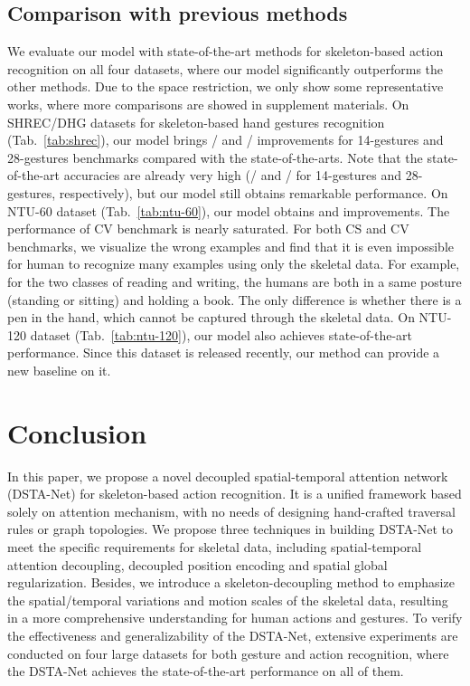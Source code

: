 \documentclass[runningheads]{llncs}
\begin{document}
\subsection{Comparison with previous methods}
We evaluate our model with state-of-the-art methods for skeleton-based action recognition on all four datasets, where our model significantly outperforms the other methods. 
Due to the space restriction, we only show some representative works, where more comparisons are showed in supplement materials. 
On SHREC/DHG datasets for skeleton-based hand gestures recognition (Tab.~\ref{tab:shrec}), our model brings / and / improvements for 14-gestures and 28-gestures benchmarks compared with the state-of-the-arts.
Note that the state-of-the-art accuracies are already very high (/ and / for 14-gestures and 28-gestures, respectively), but our model still obtains remarkable performance. 
On NTU-60 dataset (Tab.~\ref{tab:ntu-60}), our model obtains  and  improvements. 
The performance of CV benchmark is nearly saturated. For both CS and CV benchmarks, we visualize the wrong examples and find that it is even impossible for human to recognize many examples using only the skeletal data. For example, for the two classes of reading and writing, the humans are both in a same posture (standing or sitting) and holding a book. The only difference is whether there is a pen in the hand, which cannot be captured through the skeletal data. 
On NTU-120 dataset (Tab.~\ref{tab:ntu-120}), our model also achieves state-of-the-art performance. Since this dataset is released recently, our method can provide a new baseline on it. 



\section{Conclusion}
In this paper, we propose a novel decoupled spatial-temporal attention network (DSTA-Net) for skeleton-based action recognition. 
It is a unified framework based solely on attention mechanism, with no needs of designing hand-crafted traversal rules or graph topologies. 
We propose three techniques in building DSTA-Net to meet the specific requirements for skeletal data, including spatial-temporal attention decoupling, decoupled position encoding and spatial global regularization. 
Besides, we introduce a skeleton-decoupling method to emphasize the spatial/temporal variations and motion scales of the skeletal data, resulting in a more comprehensive understanding for human actions and gestures. 
To verify the effectiveness and generalizability of the DSTA-Net, extensive experiments are conducted on four large datasets for both gesture and action recognition, where the DSTA-Net achieves the state-of-the-art performance on all of them. 




\end{document}
